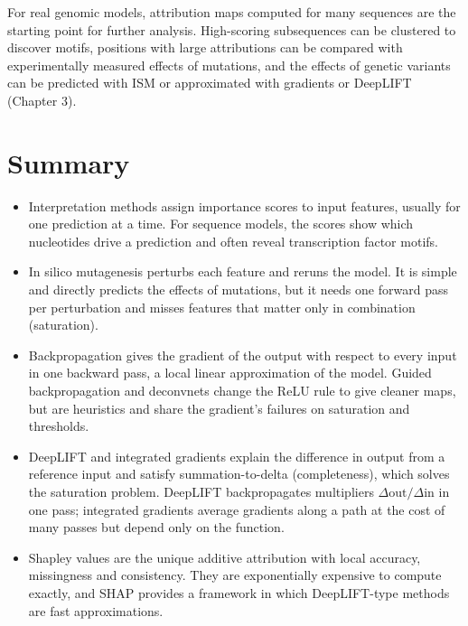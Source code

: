 For real genomic models, attribution maps computed for many sequences are the starting point for further analysis. High-scoring subsequences can be clustered to discover motifs, positions with large attributions can be compared with experimentally measured effects of mutations, and the effects of genetic variants can be predicted with ISM or approximated with gradients or DeepLIFT (Chapter 3).

\section{Summary}

\begin{itemize}
  \item Interpretation methods assign importance scores to input features, usually for one prediction at a time. For sequence models, the scores show which nucleotides drive a prediction and often reveal transcription factor motifs.
  \item In silico mutagenesis perturbs each feature and reruns the model. It is simple and directly predicts the effects of mutations, but it needs one forward pass per perturbation and misses features that matter only in combination (saturation).
  \item Backpropagation gives the gradient of the output with respect to every input in one backward pass, a local linear approximation of the model. Guided backpropagation and deconvnets change the ReLU rule to give cleaner maps, but are heuristics and share the gradient's failures on saturation and thresholds.
  \item DeepLIFT and integrated gradients explain the difference in output from a reference input and satisfy summation-to-delta (completeness), which solves the saturation problem. DeepLIFT backpropagates multipliers $\Delta\text{out}/\Delta\text{in}$ in one pass; integrated gradients average gradients along a path at the cost of many passes but depend only on the function.
  \item Shapley values are the unique additive attribution with local accuracy, missingness and consistency. They are exponentially expensive to compute exactly, and SHAP provides a framework in which DeepLIFT-type methods are fast approximations.
\end{itemize}

